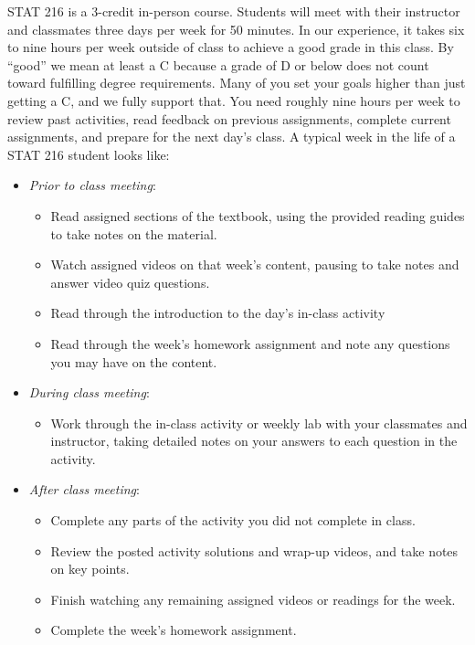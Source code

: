 \documentclass[
]{report}
\providecommand{\tightlist}{%
  \setlength{\itemsep}{0pt}\setlength{\parskip}{0pt}}
\begin{document}
STAT 216 is a 3-credit in-person course. Students will meet with their instructor and classmates three days per week for 50 minutes. In our experience, it takes six to nine hours per week outside of class to achieve a good grade in this class. By ``good'' we mean at least a C because a grade of D or below does not count toward fulfilling degree requirements. Many of you set your goals higher than just getting a C, and we fully support that. You need roughly nine hours per week to review past activities, read feedback on previous assignments, complete current assignments, and prepare for the next day's class. A typical week in the life of a STAT 216 student looks like:

\begin{itemize}
\tightlist
\item
  \emph{Prior to class meeting}:

  \begin{itemize}
  \tightlist
  \item
    Read assigned sections of the textbook, using the provided reading guides to take notes on the material.
  \item
    Watch assigned videos on that week's content, pausing to take notes and answer video quiz questions.
  \item
    Read through the introduction to the day's in-class activity
  \item
    Read through the week's homework assignment and note any questions you may have on the content.
  \end{itemize}
\item
  \emph{During class meeting}:

  \begin{itemize}
  \tightlist
  \item
    Work through the in-class activity or weekly lab with your classmates and instructor, taking detailed notes on your answers to each question in the activity.
  \end{itemize}
\item
  \emph{After class meeting}:

  \begin{itemize}
  \tightlist
  \item
    Complete any parts of the activity you did not complete in class.
  \item
    Review the posted activity solutions and wrap-up videos, and take notes on key points.
  \item
    Finish watching any remaining assigned videos or readings for the week.
  \item
    Complete the week's homework assignment.
  \end{itemize}
\end{itemize}
\end{document}
